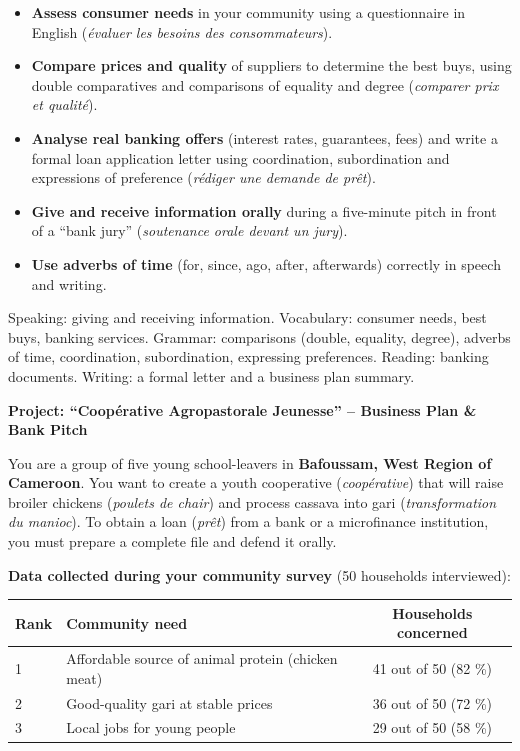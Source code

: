 \documentclass[11pt]{article}
\newcounter{popsec}
\newcounter{popsub}
\newcommand{\courssub}[1]{%
  \stepcounter{popsub}%
  \par\vspace{9pt}\noindent{\popxbold\fontsize{11.5}{13}\selectfont\color{popink}{\color{poporange}\thepopsec.\thepopsub}\hspace{6pt}#1}\par\nopagebreak\vspace{4pt}
}
\begin{document}
\begin{itemize}
\item \textbf{Assess consumer needs} in your community using a questionnaire in English (\emph{évaluer les besoins des consommateurs}).
\item \textbf{Compare prices and quality} of suppliers to determine the best buys, using double comparatives and comparisons of equality and degree (\emph{comparer prix et qualité}).
\item \textbf{Analyse real banking offers} (interest rates, guarantees, fees) and write a formal loan application letter using coordination, subordination and expressions of preference (\emph{rédiger une demande de prêt}).
\item \textbf{Give and receive information orally} during a five-minute pitch in front of a ``bank jury'' (\emph{soutenance orale devant un jury}).
\item \textbf{Use adverbs of time} (for, since, ago, after, afterwards) correctly in speech and writing.
\end{itemize}

\begin{aretenir}
Speaking: giving and receiving information. Vocabulary: consumer needs, best buys, banking services. Grammar: comparisons (double, equality, degree), adverbs of time, coordination, subordination, expressing preferences. Reading: banking documents. Writing: a formal letter and a business plan summary.
\end{aretenir}

\courssub{Situation}

\textbf{Project: ``Coopérative Agropastorale Jeunesse'' -- Business Plan \& Bank Pitch}

You are a group of five young school-leavers in \textbf{Bafoussam, West Region of Cameroon}. You want to create a youth cooperative (\emph{coopérative}) that will raise broiler chickens (\emph{poulets de chair}) and process cassava into gari (\emph{transformation du manioc}). To obtain a loan (\emph{prêt}) from a bank or a microfinance institution, you must prepare a complete file and defend it orally.

\textbf{Data collected during your community survey} (50 households interviewed):

\begin{center}
\begin{tabularx}{\linewidth}{|l|X|c|}\hline
\rowcolor{popblueL} \textbf{Rank} & \textbf{Community need} & \textbf{Households concerned} \\ \hline
1 & Affordable source of animal protein (chicken meat) & 41 out of 50 (82 \%) \\ \hline
2 & Good-quality gari at stable prices & 36 out of 50 (72 \%) \\ \hline
3 & Local jobs for young people & 29 out of 50 (58 \%) \\ \hline
\end{tabularx}
\end{center}
\end{document}
